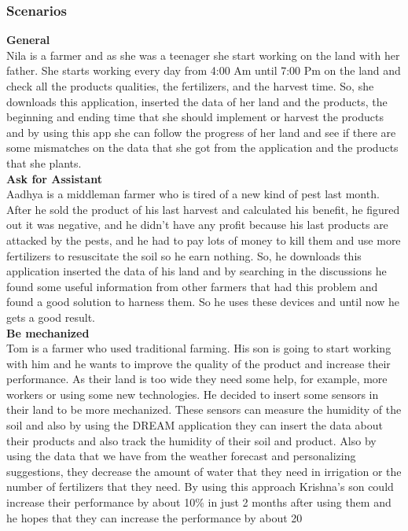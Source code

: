     \subsubsection{Scenarios}
 \textbf{General}\\
    Nila is a farmer and as she was a teenager she start working on the land with her father. She starts working every day from 4:00 Am until 7:00 Pm on the land and check all the products qualities, the fertilizers, and the harvest time. So, she downloads this application, inserted the data of her land and the products, the beginning and ending time that she should implement or harvest the products and by using this app she can follow the progress of her land and see if there are some mismatches on the data that she got from the application and the products that she plants.
\newline
\\
\textbf{Ask for Assistant}\\
Aadhya is a middleman farmer who is tired of a new kind of pest last month. After he sold the product of his last harvest and calculated his benefit, he figured out it was negative, and he didn’t have any profit because his last products are attacked by the pests, and he had to pay lots of money to kill them and use more fertilizers to resuscitate the soil so he earn nothing. So, he downloads this application inserted the data of his land and by searching in the discussions he found some useful information from other farmers that had this problem and found a good solution to harness them. So he uses these devices and until now he gets a good result.
\newline
\\
\textbf{Be mechanized}\\
Tom is a farmer who used traditional farming. His son is going to start working with him and he wants to improve the quality of the product and increase their performance. As their land is too wide they need some help, for example, more workers or using some new technologies. He decided to insert some sensors in their land to be more mechanized. These sensors can measure the humidity of the soil and also by using the DREAM application they can insert the data about their products and also track the humidity of their soil and product. Also by using the data that we have from the weather forecast and personalizing suggestions, they decrease the amount of water that they need in irrigation or the number of fertilizers that they need. By using this approach Krishna’s son could increase their performance by about 10\% in just 2 months after using them and he hopes that they can increase the performance by about 20%

